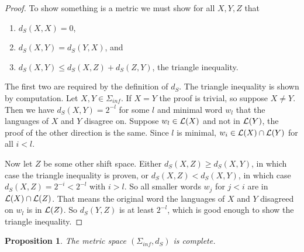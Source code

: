 \documentclass[11pt, reqno]{amsart}
\theoremstyle{plain}
\newtheorem{prop}[thm]{Proposition}
\theoremstyle{definition}
\begin{document}
\begin{proof}
    To show something is a metric we must show for all $X,Y,Z$ that
    \begin{enumerate}
        \item $d_S(X,X) = 0$,
        \item $d_S(X,Y) = d_S(Y,X)$, and
        \item $d_S(X,Y) \leq d_S(X,Z) + d_S(Z,Y)$, the triangle inequality.
    \end{enumerate}

    The first two are required by the definition of $d_S$. The triangle inequality is shown by computation.  Let $X, Y \in \Sigma_{inf}$. If $X = Y$ the proof is trivial, so suppose $X \neq Y$. Then we have $d_S(X,Y) = 2^{-l}$ for some $l$ and minimal word $w_l$ that the languages of $X$ and $Y$ disagree on. Suppose $w_l \in \mathcal{L}(X)$ and not in $\mathcal{L}(Y)$, the proof of the other direction is the same. Since $l$ is minimal, $w_i \in \mathcal{L}(X) \cap \mathcal{L}(Y)$ for all $i < l$.

    Now let $Z$ be some other shift space. Either $d_S(X, Z) \geq d_S(X,Y)$, in which case the triangle inequality is proven, or $d_S(X, Z) < d_S(X,Y)$, in which case $d_S(X, Z) = 2^{-i} < 2^{-l}$ with $i > l$. So all smaller words $w_j$ for $j < i$ are in $\mathcal{L}(X) \cap \mathcal{L}(Z)$. That means the original word the languages of $X$ and $Y$ disagreed on $w_l$ is in $\mathcal{L}(Z)$. So $d_S(Y,Z)$ is at least $2^{-l}$, which is good enough to show the triangle inequality.
\end{proof}

\begin{prop}
    The metric space $(\Sigma_{inf}, d_S)$ is complete.
\end{prop}
\end{document}
